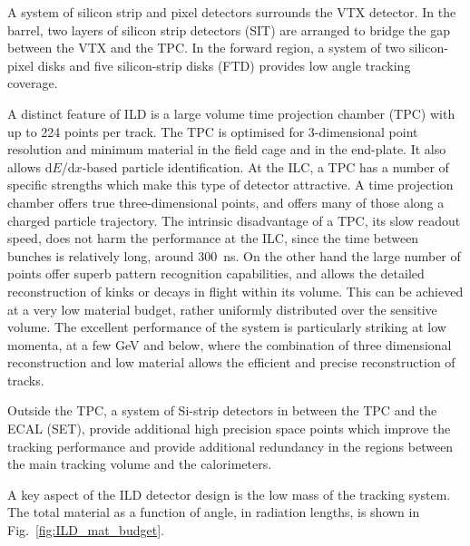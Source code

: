 A system of silicon strip and pixel detectors surrounds the VTX detector. In the barrel, two layers of silicon strip detectors (SIT) are arranged to bridge the gap between the VTX and the TPC. In the forward region, a system of two silicon-pixel disks and five silicon-strip disks (FTD) provides low angle tracking coverage.

A distinct feature of ILD is a large volume time projection chamber
(TPC) with up to 224 points per track. The TPC is optimised for
3-dimensional point resolution and minimum material in the field cage
and in the end-plate. It also allows d$E$/d$x$-based particle
identification. At the ILC,  a TPC has a number of specific strengths
 which make this type of detector attractive. A time projection
 chamber offers true three-dimensional points, and offers many of
 those along a charged particle trajectory. The intrinsic disadvantage
 of a TPC, its slow readout speed, does not harm the
 performance at the ILC, since the time between bunches is relatively
 long, around 300~ns. On the other hand the large number of
 points offer superb pattern recognition capabilities, and allows the
 detailed reconstruction of kinks or decays in flight within its
 volume. This can be achieved at a very low material budget, rather
 uniformly distributed over the sensitive volume. The excellent
 performance of the system is particularly striking at low momenta, at
 a few GeV and below, where the combination of three dimensional
 reconstruction and low material 
allows the efficient and precise reconstruction of tracks. 

Outside the TPC, a system of Si-strip detectors in between the TPC and
the ECAL (SET), provide additional high precision space points which
 improve the tracking performance and provide additional
    redundancy in the regions between the main tracking volume and the
    calorimeters. 

A key aspect of the ILD detector design is the low mass of the tracking system. The total material as a function of angle, in radiation lengths, is shown in Fig.~\ref{fig:ILD_mat_budget}.

